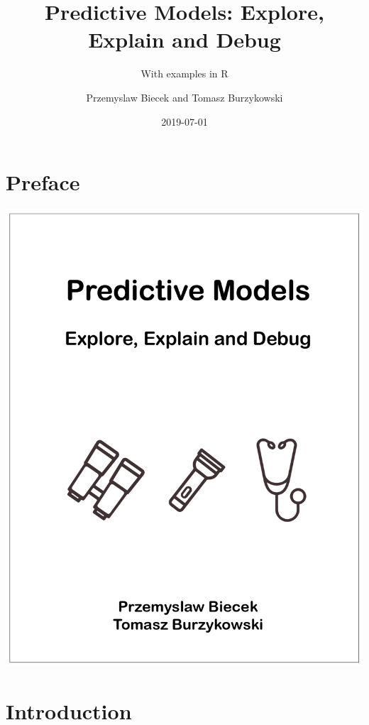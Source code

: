 \documentclass[12pt,]{krantz}
\title{Predictive Models: Explore, Explain and Debug}
\subtitle{With examples in R}
\author{Przemyslaw Biecek and Tomasz Burzykowski}
\date{2019-07-01}
\theoremstyle{definition}
\theoremstyle{definition}
\theoremstyle{definition}
\theoremstyle{remark}
\begin{document}
\maketitle

{
\hypersetup{linkcolor=black}
\setcounter{tocdepth}{2}
\tableofcontents
}
\listoftables
\listoffigures
\hypertarget{preface}{%
\section*{Preface}\label{preface}}

\begin{center}\includegraphics[width=0.99\linewidth]{figure/front} \end{center}

\hypertarget{introduction}{%
\section{Introduction}\label{introduction}}
\end{document}
